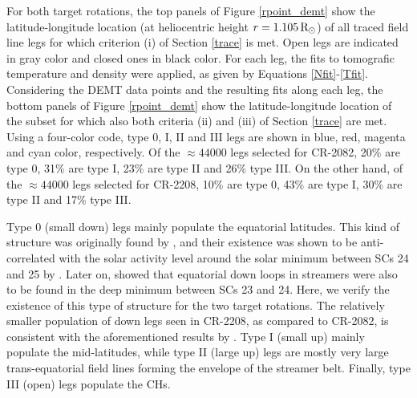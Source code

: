 \documentclass[namedreferences]{solarphysics}
\newcommand{\mrsun}{{\rm R_\odot}}
\begin{document}
\begin{article}
{For both target rotations, the top panels of Figure \ref{rpoint_demt} show the latitude-longitude location (at heliocentric height $r=1.105\,\mrsun$) of all traced field line legs for which criterion (i) of Section \ref{trace} is met. Open legs are indicated in gray color and closed ones in black color. For each leg, the fits to tomografic temperature and density were applied, as given by Equations \ref{Nfit}-\ref{Tfit}. Considering the DEMT data points and the resulting fits along each leg, the bottom panels of Figure \ref{rpoint_demt} show the latitude-longitude location of the subset for which also both criteria (ii) and (iii) of Section \ref{trace} are met. Using a four-color code, type 0, I, II and III legs are shown in blue, red, {magenta and cyan} color, respectively.} Of the {$\approx 44000$} legs selected for CR-2082, 20\% are type 0, 31\% are type I, 23\% are type II and 26\% type III. On the other hand, of the {$\approx 44000$} legs selected for CR-2208, 10\% are type 0, 43\% are type I, 30\% are type II and 17\% type III.

{Type 0 (small down) legs mainly populate the equatorial latitudes. This kind of structure was originally found by \citet{huang_2012}, and their existence was shown to be anti-correlated with the solar activity level {around the solar minimum between SCs 24 and 25} by \citet{nuevo_2013}. Later on, \citet{lloveras_2017} showed {that} equatorial down loops in streamers were also to be found in the deep minimum between SCs {23 and 24}. Here, we verify the existence of this type of structure for the two target rotations. The relatively smaller population of down legs seen in CR-2208, as compared to CR-2082, is consistent with the aforementioned results by \citet{nuevo_2013}. Type I (small up) mainly populate the mid-latitudes, while type II (large up) legs are mostly very large trans-equatorial field lines forming the envelope of the streamer belt. Finally, type III (open) legs populate the CHs.}


\end{article}
\end{document}
